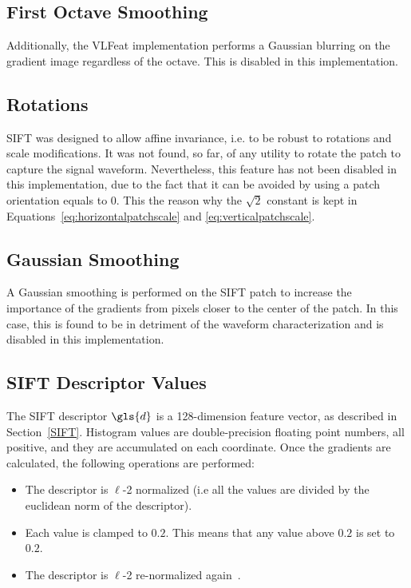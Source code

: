 \subsection{First Octave Smoothing}

Additionally, the VLFeat implementation performs a Gaussian blurring on the gradient image regardless of the octave.  This is disabled in this implementation.

\subsection{Rotations}

SIFT was designed to allow affine invariance, i.e. to be robust to rotations and scale modifications.  It was not found, so far, of any utility to rotate the patch to capture the signal waveform.  Nevertheless, this feature has not been disabled in this implementation, due to the fact that it can be avoided by using a patch orientation equals to $0$.  This the reason why the $\sqrt{2}$ constant is kept in Equations~\ref{eq:horizontalpatchscale} and \ref{eq:verticalpatchscale}.

\subsection{Gaussian Smoothing}

A Gaussian smoothing is performed on the SIFT patch to increase the importance of the gradients from pixels closer to the center of the patch.  In this case, this is found to be in detriment of the waveform characterization and is disabled in this implementation.

\subsection{SIFT Descriptor Values}

The SIFT descriptor $\gls{d}$ is a 128-dimension feature vector, as described in Section~\ref{SIFT}.  Histogram values are double-precision floating point numbers, all positive, and they are accumulated on each coordinate.  Once the gradients are calculated, the following operations are performed:

\begin{itemize}
\item The descriptor is $\ell$-2 normalized (i.e all the values are divided by the euclidean norm of the descriptor).
\item Each value is clamped to $0.2$.  This means that any value above $0.2$ is set to $0.2$.
\item The descriptor is $\ell$-2 re-normalized again~\cite{Rey-Otero2014}.
\end{itemize}

